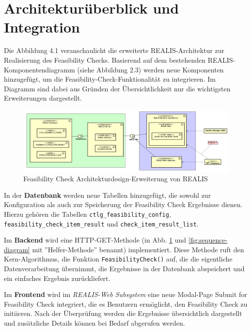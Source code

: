 \section{Architekturüberblick und Integration}

Die Abbildung 4.1 veranschaulicht die erweiterte REALIS-Architektur zur Realisierung des Feasibility Checks. Basierend auf dem bestehenden REALIS-Komponenten\-diagramm (siehe Abbildung 2.3) werden neue Komponenten hinzugefügt, um die Feasibility-Check-Funktionalität zu integrieren. Im Diagramm sind dabei aus Gründen der Übersichtlichkeit nur die wichtigsten Erweiterungen dargestellt.

\begin{figure}[!htbp]
    \centering
    \includegraphics[width=1\textwidth]{bilder/REALIS-Komponentendiagramm-mit-Erweiterungen.png}
    \caption{Feasibility Check Architekturdesign-Erweiterung von \gls{REALIS}}
    \label{fig:feasibility-check-komponentendiagramm}
\end{figure}



In der \textbf{Datenbank} werden neue Tabellen hinzugefügt, die sowohl zur Konfiguration als auch zur Speicherung der Feasibility Check Ergebnisse dienen. Hierzu gehören die Tabellen \texttt{ctlg\_feasibility\_config}, \texttt{feasibility\_check\_item\_result} und \texttt{check\_item\_\-result\_\-list}.

Im \textbf{Backend} wird eine HTTP-GET-Methode (in Abb. \ref{fig:feasibility-check-komponentendiagramm} und \ref{fig:sequence-diagram} mit ''Helfer-Methode'' benannt) implementiert. Diese Methode ruft den Kern-Algorithmus, die Funktion \texttt{FeasibilityCheck()} auf, die die eigentliche Datenverarbeitung übernimmt, die Ergebnisse in der Datenbank abspeichert und ein einfaches Ergebnis zurückliefert.

Im \textbf{Frontend} wird im \textit{REALIS-Web Subsystem} eine neue Modal-Page \glqq Submit for Feasibility Check\grqq{} integriert, die es Benutzern ermöglicht, den Feasibility Check zu initiieren. Nach der Überprüfung werden die Ergebnisse übersichtlich dargestellt und zusätzliche Details können bei Bedarf abgerufen werden. 

